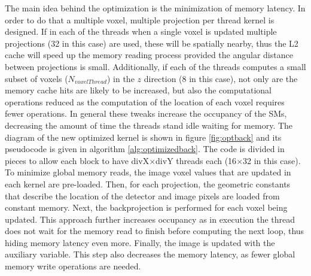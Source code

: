 The main idea behind the optimization is the minimization of memory latency. In order to do that a multiple voxel, multiple projection per thread kernel is designed. If in each of the threads when a single voxel is updated multiple projections (32 in this case) are used, these will be spatially nearby, thus the L2 cache will speed up the memory reading process provided the angular distance between projections is small. Additionally, if each of the threads computes a small subset of voxels ($N_{voxelThread}$) in the $z$ direction (8 in this case), not only are the memory cache hits are likely to be increased, but also the computational operations reduced as the computation of the location of each voxel requires fewer operations. In general these tweaks increase the occupancy of the SMs, decreasing the amount of time the threads stand idle waiting for memory. The diagram of the new optimized kernel is shown in figure \ref{fig:optback} and its pseudocode is given in algorithm \ref{alg:optimizedback}. The code is divided in pieces to allow each block to have divX$\times$divY threads each (16$\times$32 in this case). To minimize global memory reads, the image voxel values that are updated in each kernel are pre-loaded. Then, for each projection, the geometric constants that describe the location of the detector and image pixels are loaded from constant memory. Next, the backprojection is performed for each voxel being updated. This approach further increases occupancy as in execution the thread does not wait for the memory read to finish before computing the next loop, thus hiding memory latency even more. Finally, the image is updated with the auxiliary variable. This step also decreases the memory latency, as fewer global memory write operations are needed.


